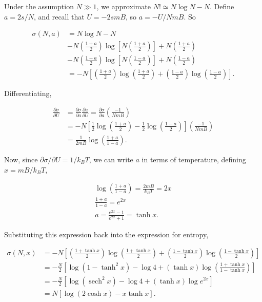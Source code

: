 \documentclass{article}
\DeclareMathOperator{\sech}{sech}
\begin{document}
\begin{enumerate}
\begin{enumerate}[(a)]
		Under the assumption $N \gg 1$, we approximate $N! \simeq N \log N - N$. Define $a = 2s/N$, and recall that $U = -2smB$, so $a = -U/NmB$. So

		\begin{align*}
		\sigma(N, a) &= N \log N - N \\
		&- N \left( \frac{1+a}{2} \right) \log \left[ N \left( \frac{1+a}{2} \right) \right] + N \left( \frac{1+a}{2} \right) \\ 
		&- N \left( \frac{1-a}{2} \right) \log \left[ N \left( \frac{1-a}{2} \right) \right] + N \left( \frac{1-a}{2} \right) \\
		&= -N \left[ \left( \frac{1+a}{2} \right) \log \left( \frac{1+a}{2} \right) + \left( \frac{1-a}{2} \right) \log \left( \frac{1-a}{2} \right)\right].
		\end{align*}

		Differentiating,

		\begin{align*}
		\frac{\partial \sigma}{\partial U} &=  \frac{\partial \sigma}{\partial a} \frac{\partial a}{\partial U} = \frac{\partial \sigma}{\partial a} \left( \frac{-1}{NmB} \right) \\
		&= -N \left[ \frac{1}{2} \log \left( \frac{1+a}{2} \right) - \frac{1}{2} \log \left( \frac{1-a}{2} \right) \right] \left( \frac{-1}{NmB} \right) \\
		&= \frac{1}{2mB} \log \left( \frac{1+a}{1-a} \right).
		\end{align*}

		Now, since $\partial \sigma / \partial U = 1 / k_B T$, we can write $a$ in terms of temperature, defining $x = mB /k_B T$,

		\begin{gather*}
		\log \left( \frac{1+a}{1-a} \right) = \frac{2mB}{k_B T} = 2x \\
		\frac{1+a}{1-a} = e^{2x} \\
		a = \frac{e^{2x} - 1}{e^{2x} + 1} = \tanh x.
		\end{gather*}

		Substituting this expression back into the expression for entropy,

		\begin{align*}
		\sigma(N, x) &= -N \left[ \left( \frac{1 + \tanh x}{2} \right) \log \left( \frac{1 + \tanh x}{2} \right) + \left( \frac{1 - \tanh x}{2} \right) \log \left( \frac{1 - \tanh x}{2} \right)  \right] \\
		&= -\frac{N}{2} \left[ \log (1-\tanh ^2 x) - \log 4 + \left( \tanh x \right) \log \left( \frac{1+\tanh x}{1-\tanh x} \right) \right] \\
		&= -\frac{N}{2} \left[ \log (\sech ^2 x) - \log 4 + \left( \tanh x \right) \log e^{2x} \right] \\
		&= N [ \log(2 \cosh x) - x \tanh x ].
		\end{align*}


\end{enumerate}
\end{enumerate}
\end{document}
